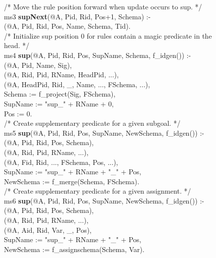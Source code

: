 \begin{figure}[!t]
\ssp
\centering
\begin{boxedminipage}{\linewidth}
/* Move the rule position forward when update occurs to sup. */ \\
ms3 {\bf supNext}(@A, Pid, Rid, Pos+1, Schema) :- \\
(@A, Pid, Rid, Pos, Name, Schema, Tid). \\
	
/* Initialize sup position 0 for rules contain a magic predicate in the head. */ \\
ms4 {\bf sup}(@A, Pid, Rid, Pos, SupName, Schema, f\_idgen()) :- \\
(@A, Pid, Name, Sig), \\
(@A, Rid, Pid, RName, HeadPid, ...), \\
(@A, HeadPid, Rid, \_, Name, ..., FSchema, ...), \\
\datalogspace Schema := f\_project(Sig, FSchema), \\
\datalogspace SupName := "sup\_" + RName + 0, \\
\datalogspace Pos := 0. \\
	
/* Create supplementary predicate for a given subgoal. */ \\
ms5 {\bf sup}(@A, Pid, Rid, Pos, SupName, NewSchema, f\_idgen()) :- \\
(@A, Pid, Rid, Pos, Schema), \\
(@A, Rid, Pid, RName, ...), \\
(@A, Fid, Rid, ..., FSchema, Pos, ...), \\
\datalogspace SupName := "sup\_" + RName + "\_" + Pos, \\
\datalogspace NewSchema := f\_merge(Schema, FSchema). \\
	
/* Create supplementary predicate for a given assignment. */ \\
ms6 {\bf sup}(@A, Pid, Rid, Pos, SupName, NewSchema, f\_idgen()) :- \\
(@A, Pid, Rid, Pos, Schema), \\
(@A, Rid, Pid, RName, ...), \\
(@A, Aid, Rid, Var, \_, Pos), \\
\datalogspace SupName := "sup\_" + RName + "\_" + Pos, \\
\datalogspace NewSchema := f\_assignschema(Schema, Var). \\ 
	

\end{boxedminipage}
\end{figure}
